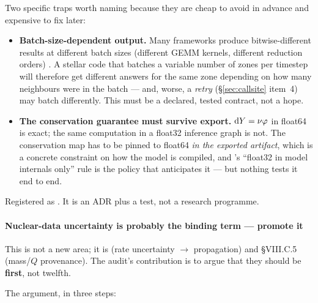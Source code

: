 Two specific traps worth naming because they are cheap to avoid in advance and
expensive to fix later:

\begin{itemize}
\item \textbf{Batch-size-dependent output.} Many frameworks produce
  bitwise-different results at different batch sizes (different GEMM kernels,
  different reduction orders) . A stellar code that batches a variable number of zones per timestep
  will therefore get different answers for the same zone depending on how many
  neighbours were in the batch --- and, worse, a \emph{retry}
  (\S\ref{sec:callsite} item~4) may batch differently. This must be a declared,
  tested contract, not a hope.
\item \textbf{The conservation guarantee must survive export.}
  $\mathrm{d} Y = \nu\varphi$ in float64 is exact; the same computation in a float32
  inference graph is not. The conservation map has to be pinned to float64
  \emph{in the exported artifact}, which is a concrete constraint on how the
  model is compiled, and 's ``float32 in model internals only''
  rule is the policy that anticipates it --- but nothing tests it end to end.
\end{itemize}

Registered as . It is an ADR plus a test, not a research programme.

\paragraph{Nuclear-data uncertainty is probably the binding term --- promote it}
\label{sec:nucleardata}

This is not a new area; it is  (rate uncertainty $\to$ \Ye{}
propagation) and \S VIII.C.5 (mass/$Q$ provenance). The audit's contribution is
to argue that they should be \textbf{first}, not twelfth.

The argument, in three steps:

